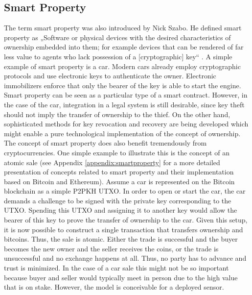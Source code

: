 \subsection{Smart Property}
\label{sec:econdev:smartproperty}

The term smart property was also introduced by Nick Szabo. He defined smart property as „Software or physical devices with the desired characteristics of ownership embedded into them; for example devices that can be rendered of far less value to agents who lack possession of a [cryptographic] key“ \parencite{szabo1997}. A simple example of smart property is a car. Modern cars already employ cryptographic protocols and use electronic keys to authenticate the owner. Electronic immobilizers enforce that only the bearer of the key is able to start the engine. Smart property can be seen as a particular type of a smart contract. However, in the case of the car, integration in a legal system is still desirable, since key theft should not imply the transfer of ownership to the thief.  On the other hand, sophisticated methods for key revocation and recovery are being developed which might enable a pure technological implementation of the concept of ownership.
The concept of smart property does also benefit tremendously from cryptocurrencies. One simple example to illustrate this is the concept of an atomic sale (see Appendix \ref{appendix:smartproperty} for a more detailed presentation of concepts related to smart property and their implementation based on Bitcoin and Ethereum). Assume a car is represented on the Bitcoin blockchain as a simple \ac{P2PKH} \ac{UTXO}. In order to open or start the car, the car demands a challenge to be signed with the private key corresponding to the \ac{UTXO}. Spending this \ac{UTXO} and assigning it to another key would allow the bearer of this key to prove the transfer of ownership to the car. Given this setup, it is now possible to construct a single transaction that transfers ownership and bitcoins. Thus, the sale is atomic. Either the trade is successful and the buyer becomes the new owner and the seller receives the coins, or the trade is unsuccessful and no exchange happens at all. Thus, no party has to advance and trust is minimized. In the case of a car sale this might not be so important because buyer and seller would typically meet in person due to the high value that is on stake. However, the model is conceivable for a deployed sensor.


